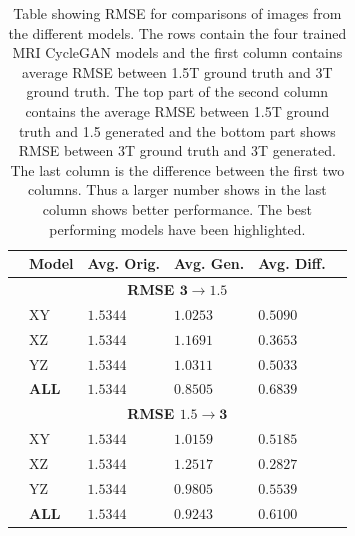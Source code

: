 \documentclass[12pt, fleqn, titlepage]{article}
\newcommand{\1}[1]{\mathds{1}\left[#1\right]}
\begin{document}
\begin{table}[H]
	\begin{center}
		\begin{tabular}{l l l l l l}
			\toprule
			& \textbf{Model} & \textbf{Avg. Orig.} & \textbf{Avg. Gen.} & \textbf{Avg. Diff.} & \\ \midrule
			&              \multicolumn{4}{c}{\textbf{RMSE $\mathbf{3\rightarrow1.5}$}}         & \\
			&XY                & $1.5344$            & $1.0253$           & $0.5090$            & \\
			&XZ                & $1.5344$            & $1.1691$           & $0.3653$            & \\
			&YZ                & $1.5344$            & $1.0311$           & $0.5033$            & \\
			&\textbf{ALL}               & $\mathbf{1.5344}$            & $\mathbf{0.8505}$           & $\mathbf{0.6839}$            & \\
			&            \multicolumn{4}{c}{\textbf{RMSE $\mathbf{1.5\rightarrow3}$}}           & \\
			&XY                & $1.5344$            & $1.0159$           & $0.5185$            & \\
			&XZ                & $1.5344$            & $1.2517$			  & $0.2827$            & \\
			&YZ                & $1.5344$            & $0.9805$           & $0.5539$            & \\
			&\textbf{ALL}               & $\mathbf{1.5344}$            & $\mathbf{0.9243}$           & $\mathbf{0.6100}$            & \\
			 \bottomrule
		\end{tabular}
		\caption{Table showing RMSE for comparisons of images from the different models. The rows contain the four trained MRI CycleGAN models and the first column contains average RMSE between 1.5T ground truth and 3T ground truth. The top part of the second column contains the average RMSE between 1.5T ground truth and 1.5 generated and the bottom part shows RMSE between 3T ground truth and 3T generated. The last column is the difference between the first two columns. Thus a larger number shows in the last column shows better performance. The best performing models have been highlighted.}
		\label{tab:metrics_rmse}
	\end{center}
\end{table}
\end{document}
